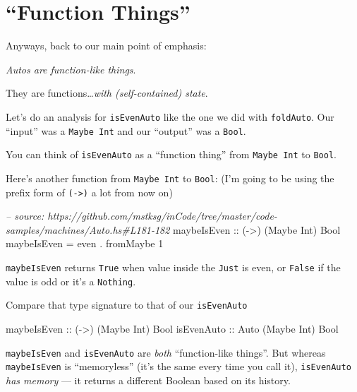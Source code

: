 \documentclass[]{article}
\newenvironment{Shaded}{}{}
\newcommand{\DataTypeTok}[1]{\textcolor[rgb]{0.56,0.13,0.00}{{#1}}}
\newcommand{\DecValTok}[1]{\textcolor[rgb]{0.25,0.63,0.44}{{#1}}}
\newcommand{\CommentTok}[1]{\textcolor[rgb]{0.38,0.63,0.69}{\textit{{#1}}}}
\newcommand{\OtherTok}[1]{\textcolor[rgb]{0.00,0.44,0.13}{{#1}}}
\newcommand{\FunctionTok}[1]{\textcolor[rgb]{0.02,0.16,0.49}{{#1}}}
\newcommand{\NormalTok}[1]{{#1}}
\begin{document}
\section{\texorpdfstring{``Function
Things''}{Function Things}}\label{function-things}

Anyways, back to our main point of emphasis:

\emph{Autos are function-like things}.

They are functions\ldots{}\emph{with (self-contained) state}.

Let's do an analysis for \texttt{isEvenAuto} like the one we did with
\texttt{foldAuto}. Our ``input'' was a \texttt{Maybe\ Int} and our ``output''
was a \texttt{Bool}.

You can think of \texttt{isEvenAuto} as a ``function thing'' from
\texttt{Maybe\ Int} to \texttt{Bool}.

Here's another function from \texttt{Maybe\ Int} to \texttt{Bool}: (I'm going to
be using the prefix form of \texttt{(-\textgreater{})} a lot from now on)

\begin{Shaded}
\begin{Highlighting}[]
\CommentTok{-- source: https://github.com/mstksg/inCode/tree/master/code-samples/machines/Auto.hs#L181-182}
\OtherTok{maybeIsEven ::} \NormalTok{(}\OtherTok{->}\NormalTok{) (}\DataTypeTok{Maybe} \DataTypeTok{Int}\NormalTok{) }\DataTypeTok{Bool}
\NormalTok{maybeIsEven }\FunctionTok{=} \NormalTok{even }\FunctionTok{.} \NormalTok{fromMaybe }\DecValTok{1}
\end{Highlighting}
\end{Shaded}

\texttt{maybeIsEven} returns \texttt{True} when value inside the \texttt{Just}
is even, or \texttt{False} if the value is odd or it's a \texttt{Nothing}.

Compare that type signature to that of our \texttt{isEvenAuto}

\begin{Shaded}
\begin{Highlighting}[]
\OtherTok{maybeIsEven ::} \NormalTok{(}\OtherTok{->}\NormalTok{) (}\DataTypeTok{Maybe} \DataTypeTok{Int}\NormalTok{) }\DataTypeTok{Bool}
\OtherTok{isEvenAuto  ::} \DataTypeTok{Auto} \NormalTok{(}\DataTypeTok{Maybe} \DataTypeTok{Int}\NormalTok{) }\DataTypeTok{Bool}
\end{Highlighting}
\end{Shaded}

\texttt{maybeIsEven} and \texttt{isEvenAuto} are \emph{both} ``function-like
things''. But whereas \texttt{maybeIsEven} is ``memoryless'' (it's the same
every time you call it), \texttt{isEvenAuto} \emph{has memory} --- it returns a
different Boolean based on its history.
\end{document}
